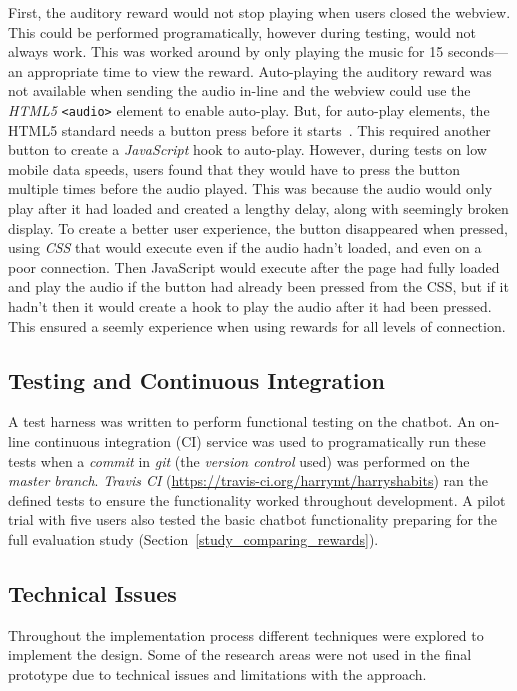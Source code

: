 First, the auditory reward would not stop playing when users closed the webview. This could be performed programatically, however during testing, would not always work. This was worked around by only playing the music for 15 seconds---an appropriate time to view the reward. Auto-playing the auditory reward was not available when sending the audio in-line and the webview could use the \textit{HTML5} \verb|<audio>| element to enable auto-play.
But, for auto-play elements, the HTML5 standard needs a button press before it starts~\cite{mozilla_autoplay}.
This required another button to create a \textit{JavaScript} hook to auto-play.
However, during tests on low mobile data speeds, users found that they would have to press the button multiple times before the audio played.
This was because the audio would only play after it had loaded and created a lengthy delay, along with seemingly broken display.
To create a better user experience, the button disappeared when pressed, using \textit{CSS} that would execute even if the audio hadn't loaded, and even on a poor connection.
Then JavaScript would execute after the page had fully loaded and play the audio if the button had already been pressed from the CSS, but if it hadn't then it would create a hook to play the audio after it had been pressed.
This ensured a seemly experience when using rewards for all levels of connection.


\subsection{Testing and Continuous Integration}
A test harness was written to perform functional testing on the chatbot. An on-line continuous integration (CI) service was used to programatically run these tests when a \textit{commit} in \textit{git} (the \textit{version control} used) was performed on the \textit{master branch}. \textit{Travis CI} (\url{https://travis-ci.org/harrymt/harryshabits}) ran the defined tests to ensure the functionality worked throughout development. A pilot trial with five users also tested the basic chatbot functionality preparing for the full evaluation study (Section~\ref{study_comparing_rewards}).


\subsection{Technical Issues}
Throughout the implementation process different techniques were explored to implement the design.
Some of the research areas were not used in the final prototype due to technical issues and limitations with the approach.

